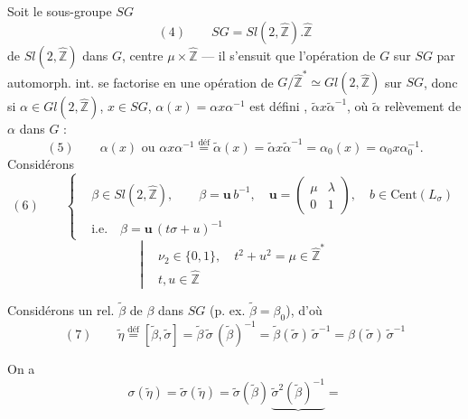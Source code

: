 \documentclass[11pt,a4paper]{article}
\begin{document}
Soit le sous-groupe $SG$ 
\[
(4) \qquad SG = Sl(2, \widehat{\mathbb{Z}}) . \widehat{\mathbb{Z}}
\]
 de $Sl(2, \widehat{\mathbb{Z}})$ dans $G$,   centre $\mu \times \widehat{\mathbb{Z}}$ --- il s'ensuit que l'opération de $G$ sur $SG$ par automorph. int. se factorise en une opération de $G/\widehat{\mathbb{Z}}^{\ast} \simeq Gl(2, \widehat{\mathbb{Z}})$ sur $SG$, donc si $\alpha \in Gl(2, \widehat{\mathbb{Z}})$, $x \in SG$, $\alpha(x) = \alpha x \alpha^{-1}$ est défini \struck{\ill{}},  $\tilde\alpha x \tilde\alpha^{-1}$, où $\tilde\alpha$  relèvement  de $\alpha$ dans $G$ :
\[
(5) \qquad \alpha(x) \text{ ou } \alpha x \alpha^{-1} \overset{\text{déf}}{=} \tilde\alpha(x) = \tilde\alpha x \tilde\alpha^{-1} = \alpha_0(x) = \alpha_0 x \alpha_0^{-1}.
\]
Considérons
\[
(6) \qquad
\left\{
\begin{aligned}
&\beta \in Sl(2, \widehat{\mathbb{Z}}), \qquad \beta = \mathbf{u}\,b^{-1}, \quad \mathbf{u} = \begin{pmatrix} \mu & \lambda \\ 0 & 1 \end{pmatrix}, \quad b \in \mathrm{Cent}(L_\sigma) \\
&\text{i.e.}\quad \beta = \mathbf{u}\,(t\sigma + u)^{-1}
\end{aligned}
\right.
\]
\[
\left|
\begin{aligned}
&\nu_2 \in \{0, 1\}, \quad t^2 + u^2 = \mu \in \widehat{\mathbb{Z}}^{\ast} \\
&t, u \in \widehat{\mathbb{Z}}
\end{aligned}
\right.
\]

Considérons un rel. $\tilde\beta$ de $\beta$ dans $SG$ (p. ex. $\tilde\beta = \beta_0$), d'où
\[
(7) \qquad \tilde\eta \overset{\text{déf}}{=} [\tilde\beta, \tilde\sigma] = \tilde\beta\,\tilde\sigma\,(\tilde\beta)^{-1}
= \tilde\beta(\tilde\sigma)\,\tilde\sigma^{-1} = \beta(\tilde\sigma)\,\tilde\sigma^{-1}
\]

On a
\[
\sigma(\tilde\eta) = \tilde\sigma(\tilde\eta) = \tilde\sigma(\tilde\beta)\,\underbrace{\tilde\sigma^2(\tilde\beta)^{-1}} =
\]
\end{document}
